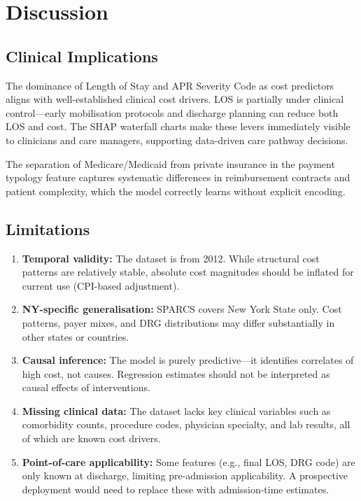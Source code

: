 \documentclass[11pt,a4paper]{article}
\begin{document}
\section{Discussion}
\subsection{Clinical Implications}
The dominance of Length of Stay and APR Severity Code as cost predictors aligns with well-established clinical cost drivers. LOS is partially under clinical control---early mobilisation protocols and discharge planning can reduce both LOS and cost. The SHAP waterfall charts make these levers immediately visible to clinicians and care managers, supporting data-driven care pathway decisions.

The separation of Medicare/Medicaid from private insurance in the payment typology feature captures systematic differences in reimbursement contracts and patient complexity, which the model correctly learns without explicit encoding.

\subsection{Limitations}
\begin{enumerate}
  \item \textbf{Temporal validity:} The dataset is from 2012. While structural cost patterns are relatively stable, absolute cost magnitudes should be inflated for current use (CPI-based adjustment).
  \item \textbf{NY-specific generalisation:} SPARCS covers New York State only. Cost patterns, payer mixes, and DRG distributions may differ substantially in other states or countries.
  \item \textbf{Causal inference:} The model is purely predictive---it identifies correlates of high cost, not causes. Regression estimates should not be interpreted as causal effects of interventions.
  \item \textbf{Missing clinical data:} The dataset lacks key clinical variables such as comorbidity counts, procedure codes, physician specialty, and lab results, all of which are known cost drivers.
  \item \textbf{Point-of-care applicability:} Some features (e.g., final LOS, DRG code) are only known at discharge, limiting pre-admission applicability. A prospective deployment would need to replace these with admission-time estimates.
\end{enumerate}
\end{document}
